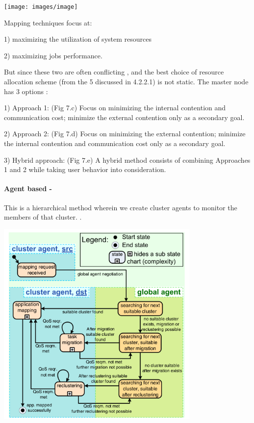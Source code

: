 \texttt{[image: images/image]}%

Mapping techniques focus at:

1) maximizing the utilization of system resources

2) maximizing jobs performance. 

But since these two are often conflicting , and the best choice of
resource allocation scheme (from the 5 discussed in 4.2.2.1) is not
static. The master node has 3 options :

1) Approach 1: (Fig 7.c) Focus on minimizing the internal contention
and communication cost; minimize the external contention only as a
secondary goal.

2) Approach 2: (Fig 7.d) Focus on minimizing the external contention;
minimize the internal contention and communication cost only as a
secondary goal. 

3) Hybrid approach: (Fig 7.e) A hybrid method consists of combining
Approaches 1 and 2 while taking user behavior into consideration. 


\paragraph{Agent based - }

This is a hierarchical method wherein we create cluster agents to
monitor the members of that cluster. \cite{4555921}.

\includegraphics[width=10cm]{images/6}%

